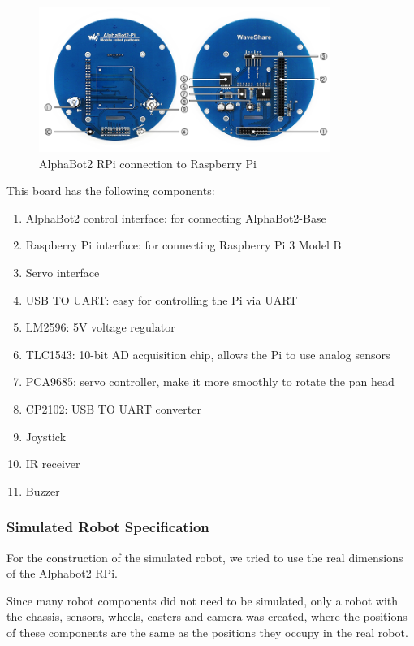 \documentclass[conference]{IEEEtran}
\begin{document}
\begin{figure}[H]
    \centering
    \includegraphics[width=9.50cm]{AlphaBot2-Pi-intro.jpg}
    \caption{AlphaBot2 RPi connection to Raspberry Pi}
    \label{fig:fig3}
\end{figure}

This board has the following components:

\begin{enumerate}
    \item AlphaBot2 control interface: for connecting AlphaBot2-Base
    \item Raspberry Pi interface: for connecting Raspberry Pi 3 Model B
    \item Servo interface
    \item USB TO UART: easy for controlling the Pi via UART
    \item LM2596: 5V voltage regulator
    \item TLC1543: 10-bit AD acquisition chip, allows the Pi to use analog sensors
    \item PCA9685: servo controller, make it more smoothly to rotate the pan head
    \item CP2102: USB TO UART converter
    \item Joystick
    \item IR receiver
    \item Buzzer
\end{enumerate}

\subsubsection{Simulated Robot Specification} \label{spec_sim}

For the construction of the simulated robot, we tried to use the real dimensions of the Alphabot2 RPi.

Since many robot components did not need to be simulated, only a robot with the chassis, sensors, wheels, casters and camera was created, where the positions of these components are the same as the positions they occupy in the real robot.
\end{document}

